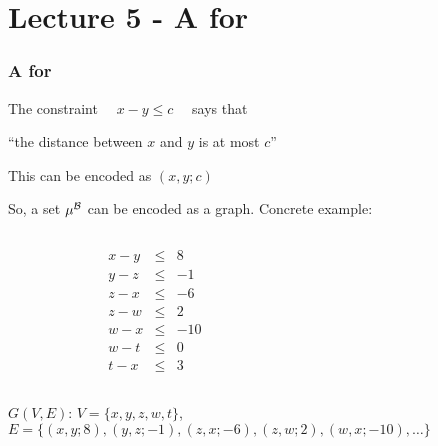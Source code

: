 \section{Lecture 5 - A \tsolver for \Idl}

\begin{frame}
  \frametitle{A \tsolver for \Idl}

  \scriptsize

  The constraint $\quad x - y \leq c \quad$ says that 
  
  \begin{center}
    ``the distance between $x$ and $y$ is at most $c$''
  \end{center}

  This can be encoded as $(x,y;c)$

  \begin{center}
    
  \end{center}

  \vfill
  So, a set $\mu^{\mathcal{B}}$ can be encoded as a graph. Concrete example:

  \begin{columns}

    \begin{column}{.3\textwidth}
      $$
      \begin{array}{rcr}
	x - y & \leq & 8   \\
	y - z & \leq & -1  \\
	z - x & \leq & -6  \\
	z - w & \leq & 2   \\
	w - x & \leq & -10 \\
	w - t & \leq & 0   \\
	t - x & \leq & 3     
      \end{array}
      $$
    \end{column}

    \begin{column}{.6\textwidth}
      \begin{center}
	
      \end{center}
    \end{column}

  \end{columns}
  \vfill
  $G( V, E )$: $V = \{ x, y, z, w, t \}$, $E = \{ (x,y;8), (y,z;-1), (z,x;-6), (z,w;2), (w,x;-10), \ldots \}$ 

\end{frame}

